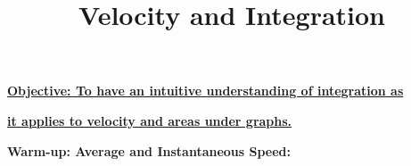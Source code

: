 \documentclass{article}
\begin{document}
\title{Velocity and Integration}
\date{}

\maketitle
\thispagestyle{empty}

\Large

\textbf{\underline{Objective: To have an intuitive understanding of integration as}}

\textbf{\underline{it applies to velocity and areas under graphs.}}



\vspace{5mm}


{\bf Warm-up: Average and Instantaneous Speed:}

\vspace{5mm}
\end{document}
